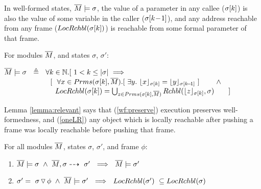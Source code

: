 
 
In well-formed states, $\Mtwo \models \sigma$,    the value of a parameter in  any callee   (${\RestictTo  \sigma {k}}$) is also the %
 value of some variable in the caller (${\RestictTo  \sigma {k\!-\!1}}$),
and any address reachable from any frame (${\LRelevantO   {\RestictTo  \sigma {k}} }$) is reachable from some formal parameter of that frame. 
 


\begin{definition}
\label{def:wf:state}
 For modules $\Mtwo$, and  states $\sigma$, $\sigma'$:

$\Mtwo \models \sigma \ \ \triangleq \ \  \forall k\in \mathbb{N}. [ \  1<k\leq \DepthFs {\sigma} \ \Longrightarrow $\\
$\strut \hspace{2.25cm}[\ \ \forall   x \in   \Formals {\RestictTo  \sigma {k}} {\Mtwo}.[\ \exists y. \ \interpret {\RestictTo  \sigma {k}}  {x} = \interpret {\RestictTo  \sigma {k\!-\!1}}  {y} \ ]$ $\hspace{0.3cm} \ \ \  \wedge$  
\\
$\strut \hspace{2.5cm}  {\LRelevantO   {\RestictTo  \sigma {k}} } = \bigcup_{z \in {\Formals {\RestictTo  {\sigma} {k}} {\Mtwo}}}  
{\Relevant { \interpret   {\RestictTo  \sigma {k}}  {z}}\sigma }  \  \ \ \ \ \ ] $
\end{definition}
 
 
 
Lemma  \ref{lemma:relevant} %
says that 
(\ref{wf:preserve}) execution preserves well-formedness, and 
(\ref{oneLR}) any object which is locally reachable after pushing a frame was locally reachable before pushing that frame.
 
\begin{lemma}
\label{lemma:relevant}
\label{l:wf:state}
\label{lemma:push:N}
For all modules $\Mtwo$, states $\sigma$, $\sigma'$,   and frame $\phi$:
\begin{enumerate}
\item
\label{wf:preserve}
$\Mtwo \models \sigma \ \wedge \ {\exec{\Mtwo} {\sigma} {\sigma'}}  \ \    \Longrightarrow \ \ \Mtwo \models \sigma' $
\item
\label{oneLR}
{$ \sigma'= \PushSF {\phi} {\sigma}   \ \wedge  \   \Mtwo \models \sigma' %
 \ \  \Longrightarrow\ \ \LRelevantO {\sigma'}\  \subseteq \LRelevantO   {\sigma}$}

\end{enumerate}
\end{lemma}

